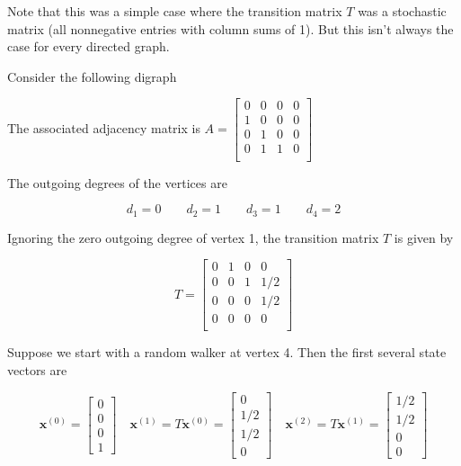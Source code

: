 \documentclass[12pt]{article}
\newcommand{\iter}[1]{^{\myp{#1}}}
\newcommand{\nin}{\noindent}
\newcommand{\vthree}{\vspace{3mm}}
\newcommand{\myp}[1]{\left( #1 \right)}
\newcommand{\mymat}[1]{
\left[
\begin{array}{rrrrrrrrrrrrrrrrrrrrrrrrrrrrrrrrrrrrrrr}
#1
\end{array}
\right]
}
\newcommand{\bx}{\mathbf{x}}
\begin{document}
\vthree

\nin Note that this was a simple case where the transition matrix $T$ was a stochastic matrix (all nonnegative entries with column sums of 1).  But this isn't always the case for every directed graph.

\clearpage

\nin Consider the following digraph

\vthree

\begin{center}
\end{center}

\vthree

\nin The associated adjacency matrix is $A =
\mymat{
0 & 0 & 0 & 0 \\
1 & 0 & 0 & 0 \\
0 & 1 & 0 & 0 \\
0 & 1 & 1 & 0 \\
}
$

\vthree

\nin The outgoing degrees of the vertices are

\[
d_1 = 0 \quad\quad
d_2 = 1 \quad\quad
d_3 = 1 \quad\quad
d_4 = 2
\]

\vthree

\nin Ignoring the zero outgoing degree of vertex 1, the transition matrix $T$ is given by

\[
T =
\mymat{
0 & 1 & 0 & 0 \\
0 & 0 & 1 & 1/2 \\
0 & 0 & 0 & 1/2 \\
0 & 0 & 0 & 0 \\
}
\]

\vthree

\nin Suppose we start with a random walker at vertex 4.  Then the first several state vectors are

\[
 \bx\iter{0} = \mymat{0 \\ 0 \\ 0 \\ 1}
 \quad
 \bx\iter{1} = T\bx\iter{0} = \mymat{0 \\ 1/2 \\ 1/2 \\ 0}
 \quad
 \bx\iter{2} = T\bx\iter{1} = \mymat{1/2 \\ 1/2 \\ 0 \\ 0}
\]
\end{document}
